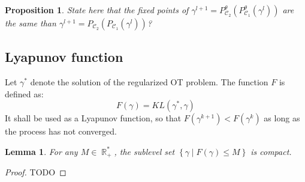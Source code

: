 \documentclass{article} %
\DeclareMathOperator{\IR}{\mathbb{R}}
\DeclareMathOperator{\Ccal}{\mathcal{C}}
\theoremstyle{plain}
\newtheorem{proposition}{Proposition}
\newtheorem{lemma}{Lemma}
\theoremstyle{definition}
\theoremstyle{remark}
\begin{document}
{\color{red} \begin{proposition} 
State here that the fixed points of   $\gamma^{l+1} =P^\theta_{\Ccal_2}(P^\theta_{\Ccal_1}(\gamma^l))$ are the same than $\gamma^{l+1} =P_{\Ccal_2}(P_{\Ccal_1}(\gamma^l))$?
\end{proposition}}
\subsection{Lyapunov function}
Let $\gamma^*$ denote the solution of the regularized OT problem.
The function $F$ is defined as:
\begin{equation}\label{eq:lyapunov_function}
F(\gamma) = KL(\gamma^*, \gamma)
\end{equation}
It shall be used as a Lyapunov function, so that $F(\gamma^{k+1}) < F(\gamma^k)$ as long as the process has not converged.


\begin{lemma} \label{lemma:KL_compact}
	For any $M \in \IR_+^*$, the sublevel set $\left\{ \gamma \mid F(\gamma) \le M \right\}$ is compact.
\end{lemma}
\begin{proof}
	{\color{red} TODO}
\end{proof}
\end{document}
